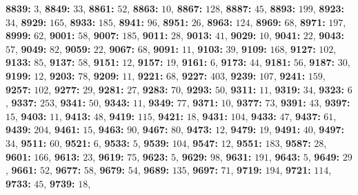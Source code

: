 \textsf{\bfseries 8839:} $3$, \textsf{\bfseries 8849:} $33$, \textsf{\bfseries 8861:} $52$, \textsf{\bfseries 8863:} $10$, \textsf{\bfseries 8867:} $128$, \textsf{\bfseries 8887:} $45$, \textsf{\bfseries 8893:} $199$, \textsf{\bfseries 8923:} $34$, \textsf{\bfseries 8929:} $165$, \textsf{\bfseries 8933:} $185$, \textsf{\bfseries 8941:} $96$, \textsf{\bfseries 8951:} $26$, \textsf{\bfseries 8963:} $124$, \textsf{\bfseries 8969:} $68$, \textsf{\bfseries 8971:} $197$, \textsf{\bfseries 8999:} $62$, \textsf{\bfseries 9001:} $58$, \textsf{\bfseries 9007:} $185$, \textsf{\bfseries 9011:} $28$, \textsf{\bfseries 9013:} $41$, \textsf{\bfseries 9029:} $10$, \textsf{\bfseries 9041:} $22$, \textsf{\bfseries 9043:} $57$, \textsf{\bfseries 9049:} $82$, \textsf{\bfseries 9059:} $22$, \textsf{\bfseries 9067:} $68$, \textsf{\bfseries 9091:} $11$, \textsf{\bfseries 9103:} $39$, \textsf{\bfseries 9109:} $168$, \textsf{\bfseries 9127:} $102$, \textsf{\bfseries 9133:} $85$, \textsf{\bfseries 9137:} $58$, \textsf{\bfseries 9151:} $12$, \textsf{\bfseries 9157:} $19$, \textsf{\bfseries 9161:} $6$, \textsf{\bfseries 9173:} $44$, \textsf{\bfseries 9181:} $56$, \textsf{\bfseries 9187:} $30$, \textsf{\bfseries 9199:} $12$, \textsf{\bfseries 9203:} $78$, \textsf{\bfseries 9209:} $11$, \textsf{\bfseries 9221:} $68$, \textsf{\bfseries 9227:} $403$, \textsf{\bfseries 9239:} $107$, \textsf{\bfseries 9241:} $159$, \textsf{\bfseries 9257:} $102$, \textsf{\bfseries 9277:} $29$, \textsf{\bfseries 9281:} $27$, \textsf{\bfseries 9283:} $70$, \textsf{\bfseries 9293:} $50$, \textsf{\bfseries 9311:} $11$, \textsf{\bfseries 9319:} $34$, \textsf{\bfseries 9323:} $6$, \textsf{\bfseries 9337:} $253$, \textsf{\bfseries 9341:} $50$, \textsf{\bfseries 9343:} $11$, \textsf{\bfseries 9349:} $77$, \textsf{\bfseries 9371:} $10$, \textsf{\bfseries 9377:} $73$, \textsf{\bfseries 9391:} $43$, \textsf{\bfseries 9397:} $15$, \textsf{\bfseries 9403:} $11$, \textsf{\bfseries 9413:} $48$, \textsf{\bfseries 9419:} $115$, \textsf{\bfseries 9421:} $18$, \textsf{\bfseries 9431:} $104$, \textsf{\bfseries 9433:} $47$, \textsf{\bfseries 9437:} $61$, \textsf{\bfseries 9439:} $204$, \textsf{\bfseries 9461:} $15$, \textsf{\bfseries 9463:} $90$, \textsf{\bfseries 9467:} $80$, \textsf{\bfseries 9473:} $12$, \textsf{\bfseries 9479:} $19$, \textsf{\bfseries 9491:} $40$, \textsf{\bfseries 9497:} $34$, \textsf{\bfseries 9511:} $60$, \textsf{\bfseries 9521:} $6$, \textsf{\bfseries 9533:} $5$, \textsf{\bfseries 9539:} $104$, \textsf{\bfseries 9547:} $12$, \textsf{\bfseries 9551:} $183$, \textsf{\bfseries 9587:} $28$, \textsf{\bfseries 9601:} $166$, \textsf{\bfseries 9613:} $23$, \textsf{\bfseries 9619:} $75$, \textsf{\bfseries 9623:} $5$, \textsf{\bfseries 9629:} $98$, \textsf{\bfseries 9631:} $191$, \textsf{\bfseries 9643:} $5$, \textsf{\bfseries 9649:} $29$, \textsf{\bfseries 9661:} $52$, \textsf{\bfseries 9677:} $58$, \textsf{\bfseries 9679:} $54$, \textsf{\bfseries 9689:} $135$, \textsf{\bfseries 9697:} $71$, \textsf{\bfseries 9719:} $194$, \textsf{\bfseries 9721:} $114$, \textsf{\bfseries 9733:} $45$, \textsf{\bfseries 9739:} $18$, 
